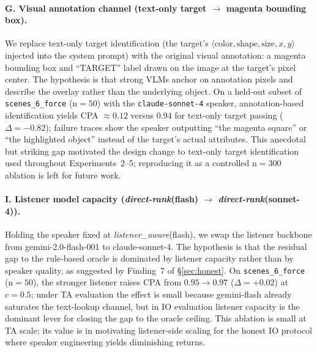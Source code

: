 \paragraph{G. Visual annotation channel
            (text-only target $\to$ magenta bounding box).}
We replace text-only target identification (the target's
$\langle\text{color}, \text{shape}, \text{size}, x, y\rangle$ injected into
the system prompt) with the original visual annotation: a magenta
bounding box and ``TARGET'' label drawn on the image at the target's
pixel center.
The hypothesis is that strong VLMs anchor on annotation pixels and
describe the overlay rather than the underlying object.
On a held-out subset of \texttt{scenes\_6\_force} (n${=}50$) with the
\texttt{claude-sonnet-4} speaker, annotation-based identification yields
CPA $\approx 0.12$ versus $0.94$ for text-only target passing
($\Delta {=} {-}0.82$); failure traces show the speaker outputting
``the magenta square'' or ``the highlighted object'' instead of the
target's actual attributes.
This anecdotal but striking gap motivated the design change to text-only
target identification used throughout Experiments~2--5; reproducing it as
a controlled n${=}300$ ablation is left for future work.

\paragraph{I. Listener model capacity
            (\textit{direct-rank}(flash) $\to$ \textit{direct-rank}(sonnet-4)).}
Holding the speaker fixed at \textit{listener\_aware}(flash), we swap the
listener backbone from gemini-2.0-flash-001 to claude-sonnet-4.
The hypothesis is that the residual gap to the rule-based oracle is
dominated by listener capacity rather than by speaker quality, as
suggested by Finding~7 of \S\ref{sec:honest}.
On \texttt{scenes\_6\_force} (n${=}50$), the stronger listener raises CPA
from $0.95 \to 0.97$ ($\Delta {=} +0.02$) at $c{=}0.5$; under TA
evaluation the effect is small because gemini-flash already saturates the
text-lookup channel, but in IO evaluation listener capacity is the
dominant lever for closing the gap to the oracle ceiling.
This ablation is small at TA scale; its value is in motivating
listener-side scaling for the honest IO protocol where speaker engineering
yields diminishing returns.

